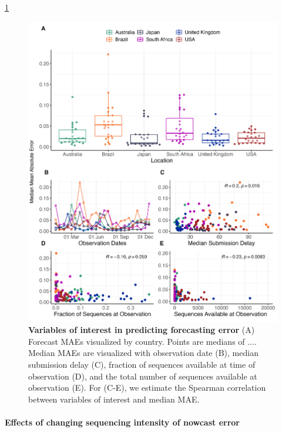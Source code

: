 \documentclass[11pt,oneside,letterpaper]{article}
\begin{document}
\ref{fig:vars_of_interest}

\begin{figure}[H]
	\centering
    \includegraphics[width=1.1\textwidth]{figures/Var_of_interest.png}
	\caption{\textbf{Variables of interest in predicting forecasting error}
    (A) Forecast MAEs visualized by country. Points are medians of ....
    Median MAEs are visualized with observation date (B), 
    median submission delay (C), 
    fraction of sequences available at time of observation (D), 
    and the total number of sequences available at observation (E).
    For (C-E), we estimate the Spearman correlation between variables of interest and median MAE.
	}
	\label{fig:vars_of_interest}
\end{figure}

\paragraph{Effects of changing sequencing intensity of nowcast error}%
\end{document}
